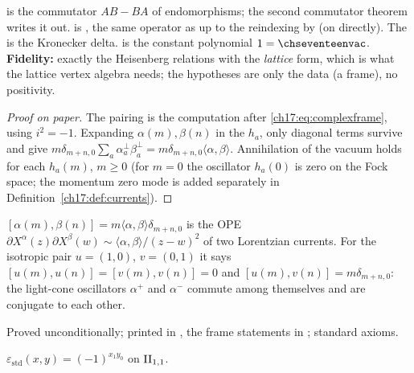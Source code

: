 \begin{dictionary}
 is the commutator $AB-BA$ of endomorphisms; the second commutator theorem writes it out.
 is , the
same operator as  up to the reindexing by
 (on  directly).  The  is the Kronecker delta.
 is the constant polynomial $1=\chseventeenvac$.  \textbf{Fidelity:} exactly the Heisenberg
relations with the \emph{lattice} form, which is what the lattice vertex algebra needs; the hypotheses are
only the data (a frame), no positivity.
\end{dictionary}

\begin{proof}[Proof on paper]
The pairing is the computation after \eqref{ch17:eq:complexframe}, using $i^2=-1$.  Expanding
$\alpha(m),\beta(n)$ in the $h_a$, only diagonal terms survive and give
$m\delta_{m+n,0}\sum_a\alpha^\perp_a\beta^\perp_a=m\delta_{m+n,0}\langle\alpha,\beta\rangle$.  Annihilation of the vacuum
holds for each $h_a(m)$, $m\ge0$ (for $m=0$ the oscillator $h_a(0)$ is zero on the Fock space; the momentum
zero mode is added separately in Definition~\ref{ch17:def:currents}).
\end{proof}

\begin{physics}
$[\alpha(m),\beta(n)]=m\langle\alpha,\beta\rangle\delta_{m+n,0}$ is the OPE $\partial X^\alpha(z)\partial X^\beta(w)\sim
\langle\alpha,\beta\rangle/(z-w)^2$ of two Lorentzian currents.  For the isotropic pair $u=(1,0)$, $v=(0,1)$ it
says $[u(m),u(n)]=[v(m),v(n)]=0$ and $[u(m),v(n)]=m\delta_{m+n,0}$: the light-cone oscillators $\alpha^+$ and
$\alpha^-$ commute among themselves and are conjugate to each other.
\end{physics}

\begin{status}
Proved unconditionally;  printed in
, the frame statements in
; standard axioms.
\end{status}

\begin{definition}\label{ch17:def:stdcocycle}
$\varepsilon_{\mathrm{std}}(x,y)=(-1)^{x_1y_0}$ on ${\mathrm{II}_{1,1}}$.
\end{definition}

